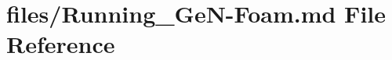 \hypertarget{Running__GeN-Foam_8md}{}\section{files/\+Running\+\_\+\+Ge\+N-\/\+Foam.md File Reference}
\label{Running__GeN-Foam_8md}
